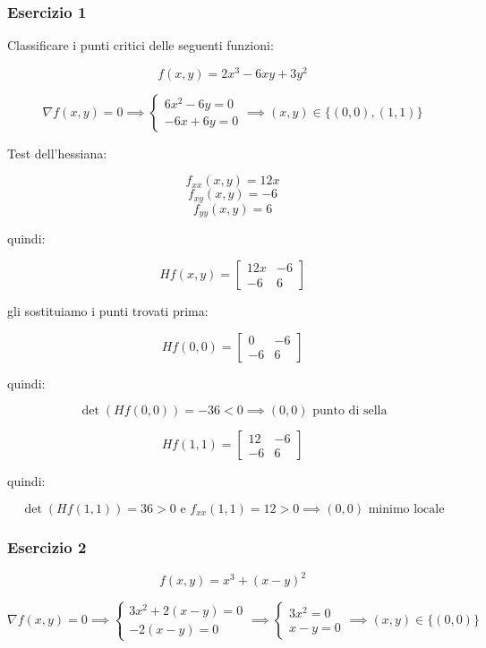 \subsubsection*{Esercizio 1}

Classificare i punti critici delle seguenti funzioni:

\[
    f(x,y) = 2x^{3}-6xy + 3y^{2}
\]

\[
    \nabla f(x,y)=0 \implies \begin{cases}
        6x^{2}-6y=0 \\
        -6x + 6y =0
    \end{cases}
    \implies
    (x,y) \in \{(0,0), (1,1)\}
\]

Test dell'hessiana:

\[
    f_{xx}(x,y) = 12x
\]
\[
    f_{xy}(x,y) = -6
\]
\[
    f_{yy}(x,y) = 6
\]

quindi:

\[
    H f(x,y) = \begin{bmatrix}
        12x & -6 \\
        -6  & 6
    \end{bmatrix}
\]

gli sostituiamo i punti trovati prima:

\[
    Hf(0,0) = \begin{bmatrix}
        0  & -6 \\
        -6 & 6
    \end{bmatrix}
\]

quindi:

\[
    \det (Hf(0,0)) = -36 <0 \implies (0,0) \text{ punto di sella}
\]

\[
    Hf(1,1) = \begin{bmatrix}
        12 & -6 \\
        -6 & 6
    \end{bmatrix}
\]

quindi:

\[
    \det (Hf(1,1)) = 36 >0 \text{ e } f_{xx}(1,1) = 12 > 0 \implies (0,0) \text{ minimo locale}
\]

\subsubsection*{Esercizio 2}

\[
    f(x,y) = x^{3} + {(x-y)}^{2}
\]

\[
    \nabla f(x,y)=0
    \implies
    \begin{cases}
        3x^{2}+2(x-y) = 0 \\
        -2(x-y) = 0
    \end{cases}
    \implies
    \begin{cases}
        3x^{2}= 0 \\
        x-y= 0
    \end{cases}
    \implies
    (x,y) \in \{(0,0)\}
\]

